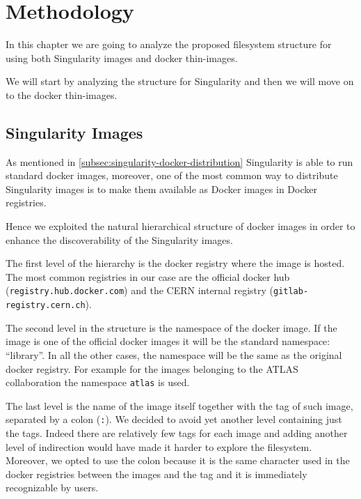 \chapter{Methodology}\label{ch:Methodology}

In this chapter we are going to analyze the proposed filesystem structure for using both Singularity images and docker thin-images. 

We will start by analyzing the structure for Singularity and then we will move on to the docker thin-images.

\section{Singularity Images}

As mentioned in \ref{subsec:singularity-docker-distribution} Singularity is able to run standard docker images, moreover, one of the most common way to distribute Singularity images is to make them available as Docker images in Docker registries.

Hence we exploited the natural hierarchical structure of docker images in order to enhance the discoverability of the Singularity images. 

The first level of the hierarchy is the docker registry where the image is hosted. The most common registries in our case are the official docker hub (\texttt{registry.hub.docker.com}) and the CERN internal registry (\texttt{gitlab-registry.cern.ch}). 

The second level in the structure is the namespace of the docker image. 
If the image is one of the official docker images it will be the standard namespace: “library”. 
In all the other cases, the namespace will be the same as the original docker registry. 
For example for the images belonging to the ATLAS collaboration the namespace \texttt{atlas} is used.

The last level is the name of the image itself together with the tag of such image, separated by a colon (\texttt{:}).
We decided to avoid yet another level containing just the tags. 
Indeed there are relatively few tags for each image and adding another level of indirection would have made it harder to explore the filesystem.
Moreover, we opted to use the colon because it is the same character used in the docker registries between the images and the tag and it is immediately recognizable by users.

